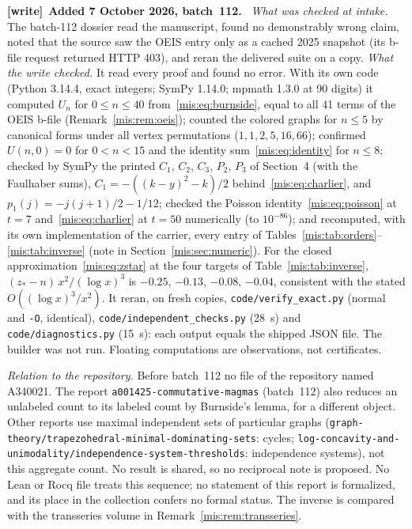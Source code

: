\documentclass[11pt]{article}
\theoremstyle{remark}\newtheorem{remark}[theorem]{Remark}
\newcommand{\file}[1]{\nolinkurl{#1}}
\newenvironment{writenote}[1][]{\par\smallskip\begingroup\small
 \noindent\textbf{[write]}\if\relax\detokenize{#1}\relax\else~\textbf{#1.}\fi\ }%
 {\par\endgroup\smallskip}
\begin{document}
\begin{writenote}[Added 7 October 2026, batch~112]
\emph{What was checked at intake.} The batch-112 dossier read the manuscript,
found no demonstrably wrong claim, noted that the source saw the OEIS entry
only as a cached 2025 snapshot (its b-file request returned HTTP 403), and
reran the delivered suite on a copy. \emph{What the write checked.} It
read every proof and found no error. With its own code (Python 3.14.4, exact
integers; SymPy 1.14.0; mpmath 1.3.0 at 90 digits) it computed $U_n$ for
$0\le n\le40$ from~\eqref{mis:eq:burnside}, equal to all 41 terms of the OEIS
b-file (Remark~\ref{mis:rem:oeis}); counted the colored graphs for $n\le5$ by
canonical forms under all vertex permutations ($1,1,2,5,16,66$); confirmed
$U(n,0)=0$ for $0<n<15$ and the identity sum~\eqref{mis:eq:identity} for
$n\le8$; checked by SymPy the printed $C_1$, $C_2$, $C_3$, $P_2$, $P_3$ of
Section~4 (with the Faulhaber sums), $C_1=-((k-y)^2-k)/2$
behind~\eqref{mis:eq:charlier}, and $p_1(j)=-j(j+1)/2-1/12$; checked the Poisson
identity~\eqref{mis:eq:poisson} at $t=7$ and~\eqref{mis:eq:charlier} at $t=50$
numerically (to $10^{-86}$); and recomputed, with its own implementation of the
carrier, every entry of Tables~\ref{mis:tab:orders}--\ref{mis:tab:inverse}
(note in Section~\ref{mis:sec:numeric}). For the closed
approximation~\eqref{mis:eq:zstar} at the four targets of
Table~\ref{mis:tab:inverse}, $(z_*-n)\,x^2/(\log x)^3$ is $-0.25$, $-0.13$,
$-0.08$, $-0.04$, consistent with the stated $O((\log x)^3/x^2)$. It reran,
on fresh copies, \file{code/verify_exact.py} (normal and \texttt{-O},
identical), \file{code/independent_checks.py} (28~s) and
\file{code/diagnostics.py} (15~s): each output equals the shipped JSON file.
The builder was not run. Floating computations are observations, not
certificates.

\emph{Relation to the repository.} Before batch~112 no file of the repository
named A340021. The report \file{a001425-commutative-magmas} (batch~112) also
reduces an unlabeled count to its labeled count by Burnside's lemma, for a
different object. Other reports use maximal independent sets of particular
graphs (\file{graph-theory/trapezohedral-minimal-dominating-sets}: cycles;
\file{log-concavity-and-unimodality/independence-system-thresholds}: independence
systems), not this aggregate count. No result is shared, so no reciprocal note
is proposed. No Lean or Rocq file treats this sequence; no statement of this
report is formalized, and its place in the collection confers no formal status.
The inverse is compared with the transseries volume in
Remark~\ref{mis:rem:transseries}.
\end{writenote}
\end{document}
